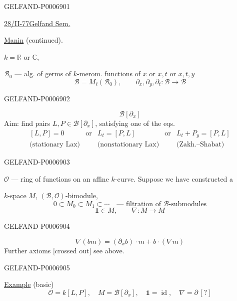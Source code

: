 \begin{GelfandAdjacentEvidence}{GELFAND-P000690}{1}

\underline{28/II-77}\qquad\underline{Gelfand Sem.}

\underline{Manin} (continued).

\(k=\mathbb R\) or \(\mathbb C\),

\(\mathcal B_0\) --- alg. of germs of \(k\)-merom. functions of \(x\) or \(x,t\)
or \(x,t,y\)
\[
\mathcal B=M_\ell(\mathcal B_0),\qquad
\partial_x,\partial_y,\partial_t:\mathcal B\to\mathcal B
\]
\end{GelfandAdjacentEvidence}
\begin{GelfandAdjacentEvidence}{GELFAND-P000690}{2}

\[
\mathcal B[\partial_x]
\]
Aim: find pairs \(L,P\in\mathcal B[\partial_x]\), satisfying one of the eqs.
\[
\begin{array}{ccccc}
[L,P]=0&\text{or}&L_t=[P,L]&\text{or}&L_t+P_y=[P,L]\\
\text{(stationary Lax)}&&\text{(nonstationary Lax)}&&\text{(Zakh.–Shabat)}
\end{array}
\]
\end{GelfandAdjacentEvidence}
\begin{GelfandAdjacentEvidence}{GELFAND-P000690}{3}

\(\mathcal O\) --- ring of functions on an affine \(k\)-curve. Suppose we have constructed a

\(k\)-space \(M\), \((\mathcal B,\mathcal O)\)-bimodule,
\[
0\subset M_0\subset M_1\subset\cdots
\quad\text{--- filtration of }\mathcal B\text{-submodules}
\]
\[
\mathbf1\in M,\qquad \nabla:M\to M
\]
\end{GelfandAdjacentEvidence}
\begin{GelfandAdjacentEvidence}{GELFAND-P000690}{4}

\[
\nabla(bm)=(\partial_x b)\cdot m+b\cdot(\nabla m)
\]
Further axioms [crossed out] see above.
\end{GelfandAdjacentEvidence}
\begin{GelfandAdjacentEvidence}{GELFAND-P000690}{5}


\underline{Example} (basic)
\[
\mathcal O=k[L,P],\quad M=\mathcal B[\partial_x],\quad
\mathbf1=\operatorname{id},\quad\nabla=\partial\,[?]
\]
\end{GelfandAdjacentEvidence}
